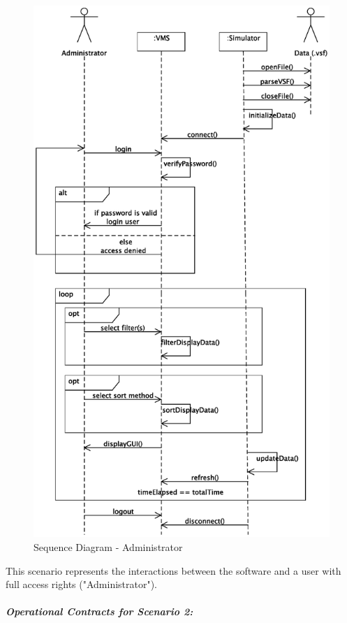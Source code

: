 \documentclass{article}
\begin{document}
\begin{figure}[!htb]
\caption{Sequence Diagram - Administrator}
\centering
\includegraphics[scale=0.5]{diagrams/admin-sequence-diagram.eps}
\end{figure}

This scenario represents the interactions between the software and a user with full access rights ("Administrator").

\subparagraph{Operational Contracts for Scenario 2:}
\end{document}
